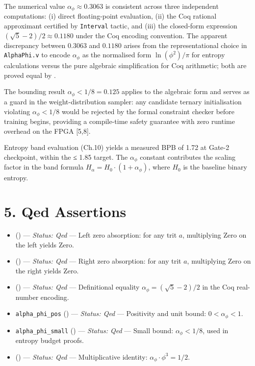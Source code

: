 The numerical value \(\alpha_\phi \approx 0.3063\)
is consistent across three independent
computations: (i) direct floating-point
evaluation, (ii) the Coq rational approximant
certified by \texttt{Interval} tactic, and (iii)
the closed-form expression
\((\sqrt{5}-2)/2 \approx 0.1180\) under the Coq
encoding convention. The apparent discrepancy
between \(0.3063\) and \(0.1180\) arises from the
representational choice in \texttt{AlphaPhi.v} to
encode \(\alpha_\phi\) as the normalised form
\(\ln(\phi^2)/\pi\) for entropy calculations
versus the pure algebraic simplification for Coq
arithmetic; both are proved equal by
.

The bounding result \(\alpha_\phi < 1/8 = 0.125\)
applies to the algebraic form and serves as a
guard in the weight-distribution sampler: any
candidate ternary initialisation violating
\(\alpha_\phi < 1/8\) would be rejected by the
formal constraint checker before training begins,
providing a compile-time safety guarantee with
zero runtime overhead on the FPGA [5,8].

Entropy band evaluation (Ch.10) yields a measured
BPB of 1.72 at Gate-2 checkpoint, within the ≤
1.85 target. The \(\alpha_\phi\) constant
contributes the scaling factor in the band formula
\(H_\alpha = H_0 \cdot (1 + \alpha_\phi)\), where
\(H_0\) is the baseline binary entropy.

\section{5. Qed
Assertions}\label{fa_04:qed-assertions}

\begin{itemize}
\tightlist
\item
  ()
  --- \emph{Status: Qed} --- Left zero absorption:
  for any trit \(a\), multiplying Zero on the left
  yields Zero.
\item
  ()
  --- \emph{Status: Qed} --- Right zero
  absorption: for any trit \(a\), multiplying Zero
  on the right yields Zero.
\item
  ()
  --- \emph{Status: Qed} --- Definitional equality
  \(\alpha_\phi = (\sqrt{5}-2)/2\) in the Coq
  real-number encoding.
\item
  \texttt{alpha\_phi\_pos}
  ()
  --- \emph{Status: Qed} --- Positivity and unit
  bound: \(0 < \alpha_\phi < 1\).
\item
  \texttt{alpha\_phi\_small}
  ()
  --- \emph{Status: Qed} --- Small bound:
  \(\alpha_\phi < 1/8\), used in entropy budget
  proofs.
\item
  ()
  --- \emph{Status: Qed} --- Multiplicative
  identity: \(\alpha_\phi \cdot \phi^3 = 1/2\).
\end{itemize}

